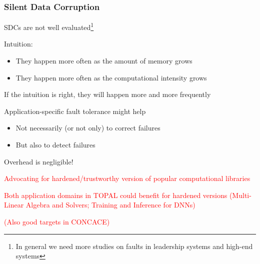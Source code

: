 \begin{frame}
  \frametitle{Silent Data Corruption}

  SDCs are not well evaluated\footnote{In general we need more studies on faults in leadership systems and high-end systems}

  Intuition:
  \begin{itemize}
  \item They happen more often as the amount of memory grows
  \item They happen more often as the computational intensity grows
  \end{itemize}

  If the intuition is right, they will happen more and more frequently

  Application-specific fault tolerance might help
  \begin{itemize}
  \item Not necessarily (or not only) to correct failures
  \item But also to detect failures
  \end{itemize}

  Overhead is negligible!

  \begin{center}
    \textcolor{red}{Advocating for hardened/trustworthy version of popular computational libraries}

    \textcolor{red}{Both application domains in TOPAL could benefit for hardened versions (Multi-Linear Algebra and Solvers; Training and Inference for DNNs)}

    \textcolor{red}{(Also good targets in CONCACE)}
  \end{center}  
\end{frame}

